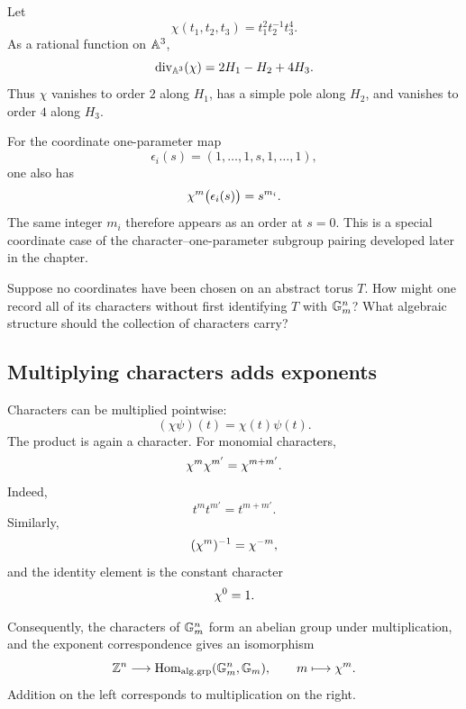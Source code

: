 \begin{example}
Let
\[
\chi(t_1,t_2,t_3)=t_1^2t_2^{-1}t_3^4.
\]
As a rational function on \(\mathbb{A}^3\),
\[
\operatorname{div}_{\mathbb{A}^3}(\chi)
=
2H_1-H_2+4H_3.
\]
Thus \(\chi\) vanishes to order \(2\) along \(H_1\), has a simple pole
along \(H_2\), and vanishes to order \(4\) along \(H_3\).
\end{example}

\begin{observation}
For the coordinate one-parameter map
\[
\epsilon_i(s)
=
(1,\ldots,1,s,1,\ldots,1),
\]
one also has
\[
\chi^{m}\bigl(\epsilon_i(s)\bigr)=s^{m_i}.
\]
The same integer \(m_i\) therefore appears as an order at \(s=0\).
This is a special coordinate case of the character--one-parameter
subgroup pairing developed later in the chapter.
\end{observation}

\begin{prediction}
Suppose no coordinates have been chosen on an abstract torus \(T\).
How might one record all of its characters without first identifying
\(T\) with \(\mathbb{G}_{m}^n\)? What algebraic structure should the collection
of characters carry?
\end{prediction}

\subsection{Multiplying characters adds exponents}

Characters can be multiplied pointwise:
\[
(\chi\psi)(t)=\chi(t)\psi(t).
\]
The product is again a character. For monomial characters,
\[
\chi^{m}\chi^{m'}
=
\chi^{m+m'}.
\]
Indeed,
\[
t^m t^{m'}
=
t^{m+m'}.
\]
Similarly,
\[
(\chi^{m})^{-1}
=
\chi^{-m},
\]
and the identity element is the constant character
\[
\chi^{0}=1.
\]

Consequently, the characters of \(\mathbb{G}_{m}^n\) form an abelian group under
multiplication, and the exponent correspondence gives an isomorphism
\[
\mathbb{Z}^n
\longrightarrow
\operatorname{Hom}_{\mathrm{alg.grp}}(\mathbb{G}_{m}^n,\mathbb{G}_{m}),
\qquad
m\longmapsto\chi^{m}.
\]
Addition on the left corresponds to multiplication on the right.


